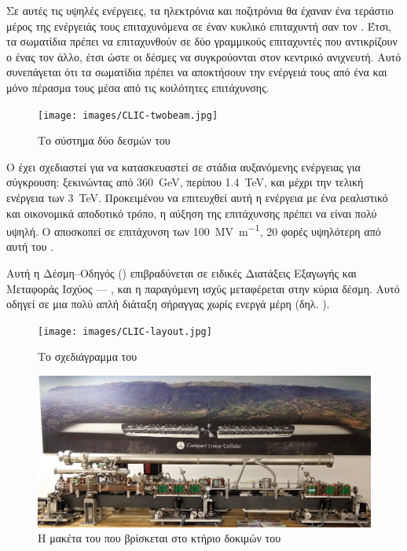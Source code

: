 Σε αυτές τις υψηλές ενέργειες, τα ηλεκτρόνια και ποζιτρόνια θα έχαναν ένα τεράστιο μέρος της ενέργειάς τους επιταχυνόμενα σε έναν κυκλικό επιταχυντή σαν τον . 
Έτσι, τα σωματίδια πρέπει να επιταχυνθούν σε δύο γραμμικούς επιταχυντές που αντικρίζουν ο ένας τον άλλο, έτσι ώστε οι δέσμες να συγκρούονται στον κεντρικό ανιχνευτή. 
Αυτό συνεπάγεται ότι τα σωματίδια πρέπει να αποκτήσουν την ενέργειά τους από ένα και μόνο πέρασμα τους μέσα από τις κοιλότητες επιτάχυνσης.

\begin{figure}[h]
\texttt{[image: images/CLIC-twobeam.jpg]}
\centering
\caption{Το σύστημα δύο δεσμών του }
\label{img:CLICtwobeamscheme}
\end{figure}

Ο  έχει σχεδιαστεί για να κατασκευαστεί σε στάδια αυξανόμενης ενέργειας για σύγκρουση: ξεκινώντας από \SI{360}{\GeV}, περίπου \SI{1.4}{\TeV}, και μέχρι την τελική ενέργεια των \SI{3}{\TeV}. 
Προκειμένου να επιτευχθεί αυτή η ενέργεια με ένα ρεαλιστικό και οικονομικά αποδοτικό τρόπο, η αύξηση της επιτάχυνσης πρέπει να είναι πολύ υψηλή.
Ο  αποσκοπεί σε επιτάχυνση των \SI[per-mode = symbol]{100}{\mega \volt \per \metre}, 20 φορές υψηλότερη από αυτή του .

Αυτή η Δέσμη--Οδηγός () επιβραδύνεται σε ειδικές Διατάξεις Εξαγωγής και Mεταφοράς Ισχύος --- , και η παραγόμενη  ισχύς μεταφέρεται στην κύρια δέσμη. 
Αυτό οδηγεί σε μια πολύ απλή διάταξη σήραγγας χωρίς ενεργά  μέρη (δηλ. ).

\begin{figure}[h]
\texttt{[image: images/CLIC-layout.jpg]}
\centering
\caption{Το σχεδιάγραμμα του }
\label{img:CLIClayout}
\end{figure}

\begin{figure}[h]
\includegraphics[width=\textwidth]{images/CLIC-maquette}
\centering
\caption[Η μακέτα του ]{Η μακέτα του  που βρίσκεται στο κτήριο δοκιμών  του }
\label{img:CLIClmaquette}
\end{figure}


